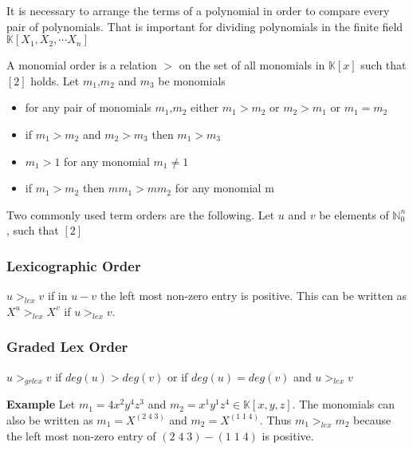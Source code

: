 It is necessary to arrange the terms of a polynomial in order to compare every pair of polynomials. That is important for dividing polynomials in the finite field
$ \mathbb{K} \left[X_{1},X_{2},\cdots X_{n}\right]  $

\begin{env_definition} 

A monomial order is a relation $>$ on the set of all monomials in $\mathbb{K}\left[x\right] $ such that $\left[ 2\right] $ holds.
Let $m_{1}$,$m_{2}$ and $m_{3}$ be monomials
\begin{center}

\begin{itemize}

\item
for any pair of monomials $m_{1}$,$m_{2}$ either $m_{1} > m_{2}$ or $m_{2} > m_{1}$ or $m_{1} = m_{2}$ 
\item
if $m_{1} > m_{2} $ and $m_{2} > m_{3}$ then $m_{1} > m_{3}$
\item
$m_{1} > 1$ for any monomial $m_{1} \neq 1$
\item
if $m_{1} > m_{2}$ then $mm_{1} > mm_{2}$ for any monomial m

\end{itemize}
 
\end{center}

\end{env_definition}

\newpage

Two commonly used term orders are the following.
Let $u$ and $v$ be elements of $\mathbb{N}^{n}_{0}$, such that $\left[ 2\right] $

\subsubsection{Lexicographic Order}
$u >_{lex} v $ if in $u-v$ the left most non-zero entry is positive.
This can be written as $X^{u} >_{lex} X^{v}$ if $u >_{lex} v $.\\


\subsubsection{Graded Lex Order}
$u >_{grlex} v $ if $ deg(u)>deg(v)$ or if $ deg(u)=deg(v)$ and $u >_{lex} v$

\textbf{Example} Let $m_{1} = 4x^{2}y^{4}z^{3}$ and $m_{2}= x^{1}y^{1}z^{4} \in \mathbb{K}\left[ x,y,z\right]  $.
The monomials can also be written as $m_{1} = X^{(2 \; 4 \; 3)}$ and $m_{2} = X^{(1 \; 1 \; 4)}$.
Thus $m_{1}>_{lex} m_{2}$ because the left most non-zero entry of $ (2 \; 4 \; 3) - (1 \; 1 \; 4)$ is positive.\\

